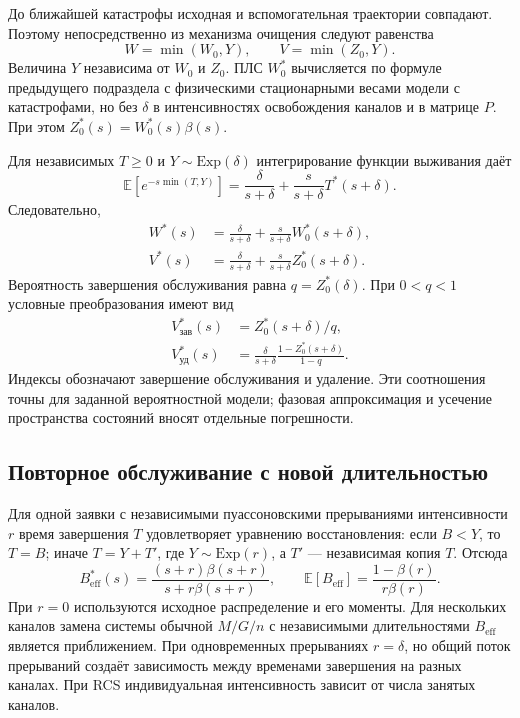 \documentclass[a4paper,12pt]{article}
\begin{document}
До ближайшей катастрофы исходная и вспомогательная траектории совпадают. Поэтому непосредственно из механизма очищения следуют равенства
\[
W=\min(W_0,Y),\qquad V=\min(Z_0,Y).
\]
Величина \(Y\) независима от \(W_0\) и \(Z_0.\) ПЛС \(W_0^*\) вычисляется по формуле предыдущего подраздела с физическими стационарными весами модели с катастрофами, но без \(\delta\) в интенсивностях освобождения каналов и в матрице \(P.\) При этом \(Z_0^*(s)=W_0^*(s)\beta(s).\)

Для независимых \(T\ge0\) и \(Y\sim\mathrm{Exp}(\delta)\) интегрирование функции выживания даёт
\[
\mathbb E[e^{-s\min(T,Y)}]=\frac{\delta}{s+\delta}+\frac{s}{s+\delta}T^*(s+\delta).
\]
Следовательно,
\begin{align*}
W^*(s)&=\frac{\delta}{s+\delta}+\frac{s}{s+\delta}W_0^*(s+\delta),\\
V^*(s)&=\frac{\delta}{s+\delta}+\frac{s}{s+\delta}Z_0^*(s+\delta).
\end{align*}
Вероятность завершения обслуживания равна \(q=Z_0^*(\delta).\) При \(0<q<1\) условные преобразования имеют вид
\begin{align*}
V_{\text{зав}}^*(s)&=Z_0^*(s+\delta)/q,\\
V_{\text{уд}}^*(s)&=\frac{\delta}{s+\delta}\frac{1-Z_0^*(s+\delta)}{1-q}.
\end{align*}
Индексы обозначают завершение обслуживания и удаление. Эти соотношения точны для заданной вероятностной модели; фазовая аппроксимация и усечение пространства состояний вносят отдельные погрешности.

\subsection{Повторное обслуживание с новой длительностью}
Для одной заявки с независимыми пуассоновскими прерываниями интенсивности \(r\) время завершения \(T\) удовлетворяет уравнению восстановления: если \(B<Y\), то \(T=B\); иначе \(T=Y+T'\), где \(Y\sim\mathrm{Exp}(r)\), а \(T'\) --- независимая копия \(T.\) Отсюда \cite{pal2017}
\[
B_{\mathrm{eff}}^*(s)=\frac{(s+r)\beta(s+r)}{s+r\beta(s+r)},\qquad
\mathbb E[B_{\mathrm{eff}}]=\frac{1-\beta(r)}{r\beta(r)}.
\]
При \(r=0\) используются исходное распределение и его моменты. Для нескольких каналов замена системы обычной \(M/G/n\) с независимыми длительностями \(B_{\mathrm{eff}}\) является приближением. При одновременных прерываниях \(r=\delta\), но общий поток прерываний создаёт зависимость между временами завершения на разных каналах. При RCS индивидуальная интенсивность зависит от числа занятых каналов.
\end{document}
